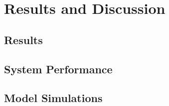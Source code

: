 \section{Results and Discussion}
\subsection{Results}
%
%
\label{Discussion}
%
%
%
\subsection{System Performance}
%
%
\subsection{Model Simulations}
%

